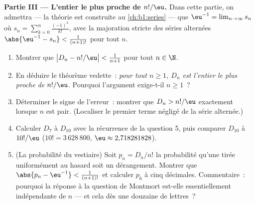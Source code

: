 \begin{problem}
\medskip
\noindent\textbf{Partie III --- L'entier le plus proche de
$n!/\eu$.} Dans cette partie, on admettra --- la théorie est construite
au \cref{ch:b1:series} --- que
$\eu^{-1} = \lim_{n \to \infty} s_n$ où $s_n = \sum_{k=0}^{n}
\frac{(-1)^k}{k!}$, avec la majoration stricte des séries alternées
$\abs{\eu^{-1} - s_n} < \frac1{(n+1)!}$ pour tout $n$.
\begin{enumerate}[resume]
  \item Montrer que $\bigl| D_n - n!/\eu \bigr| < \frac1{n+1}$ pour
        tout $n \in \N$.
  \item En déduire le théorème vedette~: \emph{pour tout $n \geq 1$,
        $D_n$ est l'entier le plus proche de $n!/\eu$}. Pourquoi
        l'argument exige-t-il $n \geq 1$~?
  \item Déterminer le signe de l'erreur~: montrer que $D_n > n!/\eu$
        exactement lorsque $n$ est pair. (Localiser le premier terme
        négligé de la série alternée.)
  \item Calculer $D_7$ à $D_{10}$ avec la récurrence de la
        question 5, puis comparer $D_{10}$ à $10!/\eu$
        ($10! = 3\,628\,800$, $\eu \approx 2{,}718281828$).
  \item (La probabilité du vestiaire) Soit $p_n = D_n/n!$ la
        probabilité qu'une  tirée uniformément au hasard soit
        un dérangement. Montrer que $\abs{p_n - \eu^{-1}} < \frac1{(n+1)!}$
        et calculer $p_6$ à cinq décimales. Commentaire~: pourquoi la
        réponse à la question de Montmort est-elle essentiellement
        indépendante de $n$ --- et cela dès une douzaine de lettres~?
\end{enumerate}


\end{problem}
